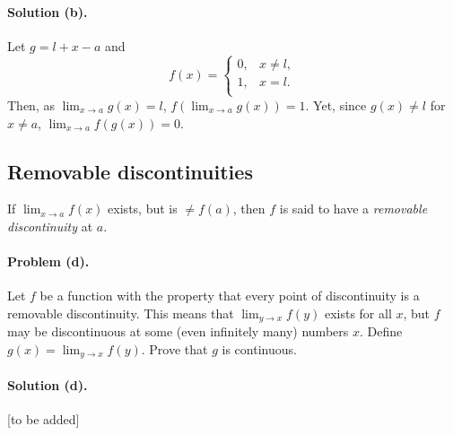 \documentclass{article}
\begin{document}
\paragraph{Solution (b).} Let $g = l + x - a$ and \begin{equation*}
  f(x) = \begin{cases}
    0, &x \neq l, \\
    1, &x = l. \\
  \end{cases}
\end{equation*}
Then, as $\lim_{x \rightarrow a}g(x) = l$, $f(\lim_{x \rightarrow a}g(x)) = 1$.
Yet, since $g(x) \neq l$ for $x \neq a$, $\lim_{x \rightarrow a}f(g(x)) = 0$.

\setcounter{subsection}{15}
\subsection{Removable discontinuities}

If $\lim_{x \rightarrow a}f(x)$ exists, but is $\neq f(a)$, then $f$ is said to
have a \emph{removable discontinuity} at $a$.

\paragraph{Problem (d).} Let $f$ be a function with the property that every
point of discontinuity is a removable discontinuity. This means that $\lim_{y
\rightarrow x}f(y)$ exists for all $x$, but $f$ may be discontinuous at some
(even infinitely many) numbers $x$. Define $g(x) = \lim_{y \rightarrow x}f(y)$.
Prove that $g$ is continuous.

\paragraph{Solution (d).} [to be added]
\end{document}
